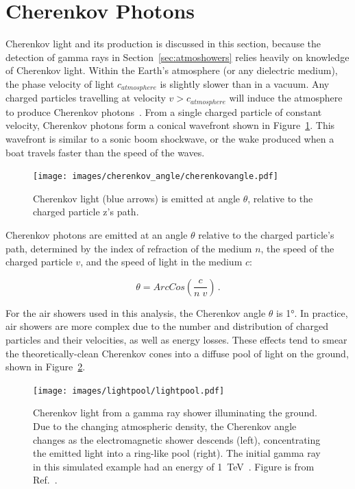   
  \FloatBarrier
    
\section{Cherenkov Photons}\label{sec:cherenkov}

  Cherenkov light and its production is discussed in this section, because the detection of gamma rays in Section~\ref{sec:atmoshowers} relies heavily on knowledge of Cherenkov light.
  Within the Earth's atmosphere (or any dielectric medium), the phase velocity of light $c_{atmosphere}$ is slightly slower than in a vacuum.
  Any charged particles travelling at velocity $v > c_{atmosphere}$ will induce the atmosphere to produce Cherenkov photons~\cite{cherenkov}.
  From a single charged particle of constant velocity, Cherenkov photons form a conical wavefront shown in Figure~\ref{fig:cherenkovangle}.
  This wavefront is similar to a sonic boom shockwave, or the wake produced when a boat travels faster than the speed of the waves.

  \begin{figure}[!t]
    \centering
    \texttt{[image: images/cherenkov\_angle/cherenkovangle.pdf]}
    \caption[Cherenkov Emission Angle]{
      Cherenkov light (blue arrows) is emitted at angle $\theta$, relative to the charged particle z's path.
    }
    \label{fig:cherenkovangle}
  \end{figure}

  Cherenkov photons are emitted at an angle $\theta$ relative to the charged particle's path, determined by the index of refraction of the medium $n$, the speed of the charged particle $v$, and the speed of light in the medium $c$:

  \begin{equation}\label{eqn:cherenkovangle}
    \theta = ArcCos \left ( \frac{c}{n \; v} \right ) \,.
  \end{equation}
  
  For the air showers used in this analysis, the Cherenkov angle $\theta$ is \nicetilde\ang{1}.
  In practice, air showers are more complex due to the number and distribution of charged particles and their velocities, as well as energy losses.
  These effects tend to smear the theoretically-clean Cherenkov cones into a diffuse pool of light on the ground, shown in Figure~\ref{fig:lightpool}.

  \begin{figure}[!t]
    \centering
    \texttt{[image: images/lightpool/lightpool.pdf]}
    \caption[Cherenkov Light Pool]{
      Cherenkov light from a gamma ray shower illuminating the ground.
      Due to the changing atmospheric density, the Cherenkov angle changes as the electromagnetic shower descends (left), concentrating the emitted light into a ring-like pool (right).
      The initial gamma ray in this simulated example had an energy of \SI{1}{\TeV{}}.
      Figure is from Ref.~\cite{Voelk}.
    }
    \label{fig:lightpool}
  \end{figure}
  
